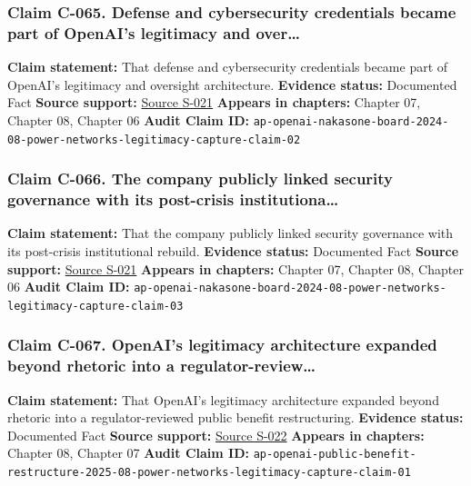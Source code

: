 \documentclass[
  american,
  11pt,
  letterpaper,
]{article}
\begin{document}
\subsubsection{Claim C-065. Defense and cybersecurity credentials became
part of OpenAI's legitimacy and
over\ldots{}}\label{claim-c-065-defense-and-cybersecurity-credentials-became-part-of-openai-s-legitimacy-and-over}

\textbf{Claim statement:} That defense and cybersecurity credentials
became part of OpenAI's legitimacy and oversight architecture.
\textbf{Evidence status:} Documented Fact \textbf{Source support:}
\hyperref[source-s-021-openai-appoints-former-top-us-cyberwarrior-paul-nakasone-to-its-board-of-directors]{Source
S-021} \textbf{Appears in chapters:} Chapter 07, Chapter 08, Chapter 06
\textbf{Audit Claim ID:}
\texttt{ap-openai-nakasone-board-2024-08-power-networks-legitimacy-capture-claim-02}

\subsubsection{Claim C-066. The company publicly linked security
governance with its post-crisis
institutiona\ldots{}}\label{claim-c-066-the-company-publicly-linked-security-governance-with-its-post-crisis-institutiona}

\textbf{Claim statement:} That the company publicly linked security
governance with its post-crisis institutional rebuild. \textbf{Evidence
status:} Documented Fact \textbf{Source support:}
\hyperref[source-s-021-openai-appoints-former-top-us-cyberwarrior-paul-nakasone-to-its-board-of-directors]{Source
S-021} \textbf{Appears in chapters:} Chapter 07, Chapter 08, Chapter 06
\textbf{Audit Claim ID:}
\texttt{ap-openai-nakasone-board-2024-08-power-networks-legitimacy-capture-claim-03}

\subsubsection{Claim C-067. OpenAI's legitimacy architecture expanded
beyond rhetoric into a
regulator-review\ldots{}}\label{claim-c-067-openai-s-legitimacy-architecture-expanded-beyond-rhetoric-into-a-regulator-review}

\textbf{Claim statement:} That OpenAI's legitimacy architecture expanded
beyond rhetoric into a regulator-reviewed public benefit restructuring.
\textbf{Evidence status:} Documented Fact \textbf{Source support:}
\hyperref[source-s-022-openai-may-move-forward-with-new-business-structure-partnership-with-microsoft-regulators-say]{Source
S-022} \textbf{Appears in chapters:} Chapter 08, Chapter 07
\textbf{Audit Claim ID:}
\texttt{ap-openai-public-benefit-restructure-2025-08-power-networks-legitimacy-capture-claim-01}
\end{document}
